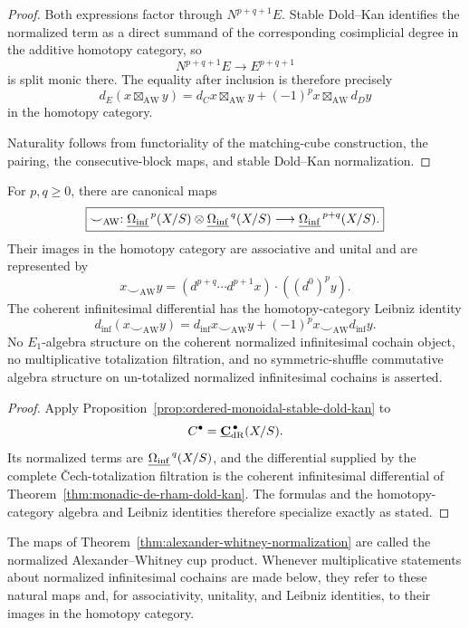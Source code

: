 \begin{proof}
Both expressions factor through \(N^{p+q+1}E\).  Stable Dold--Kan identifies
the normalized term as a direct summand of the corresponding cosimplicial
degree in the additive homotopy category, so
\[
    N^{p+q+1}E\longrightarrow E^{p+q+1}
\]
is split monic there.  The equality after inclusion is therefore precisely
\[
    d_E(x\boxtimes_{\mathrm{AW}}y)
    =
    d_Cx\boxtimes_{\mathrm{AW}}y
    +
    (-1)^p
    x\boxtimes_{\mathrm{AW}}d_Dy
\]
in the homotopy category.

Naturality follows from functoriality of the matching-cube construction, the
pairing, the consecutive-block maps, and stable Dold--Kan normalization.
\end{proof}

\begin{theorem}
\label{thm:alexander-whitney-normalization}
For \(p,q\geq0\), there are canonical maps
\[
\boxed{
    \smile_{\mathrm{AW}}:
    \underline{\Omega_{\mathrm{inf}}}^{\,p}(X/S)
    \otimes
    \underline{\Omega_{\mathrm{inf}}}^{\,q}(X/S)
    \longrightarrow
    \underline{\Omega_{\mathrm{inf}}}^{\,p+q}(X/S).
}
\]
Their images in the homotopy category are associative and unital and are represented by
\[
\boxed{
    x\smile_{\mathrm{AW}}y
    =
    \left(
        d^{p+q}\cdots d^{p+1}x
    \right)
    \cdot
    \left(
        (d^0)^py
    \right).
}
\]
The coherent infinitesimal differential has the homotopy-category Leibniz identity
\[
\boxed{
    d_{\inf}(x\smile_{\mathrm{AW}}y)
    =
    d_{\inf}x\smile_{\mathrm{AW}}y
    +
    (-1)^p
    x\smile_{\mathrm{AW}}d_{\inf}y.
}
\]
No \(E_1\)-algebra structure on the coherent normalized infinitesimal cochain object, no multiplicative totalization
filtration, and no symmetric-shuffle commutative algebra structure on un-totalized normalized infinitesimal cochains
is asserted.
\end{theorem}

\begin{proof}
Apply Proposition~\ref{prop:ordered-monoidal-stable-dold-kan} to
\[
    C^\bullet
    =
    \underline{\mathbf C}_{\mathrm{dR}}^{\,\bullet}(X/S).
\]
Its normalized terms are \(\underline{\Omega_{\mathrm{inf}}}^{\,q}(X/S)\), and the differential supplied by the
complete \v{C}ech-totalization filtration is the coherent infinitesimal differential of
Theorem~\ref{thm:monadic-de-rham-dold-kan}.  The formulas and the homotopy-category algebra and
Leibniz identities therefore specialize exactly as stated.
\end{proof}

\begin{construction}
\label{constr:normalized-modal-cup-product}
The maps of Theorem~\ref{thm:alexander-whitney-normalization} are called the normalized
Alexander--Whitney cup product.  Whenever multiplicative statements about normalized infinitesimal cochains are made
below, they refer to these natural maps and, for associativity, unitality, and Leibniz identities, to
their images in the homotopy category.
\end{construction}

